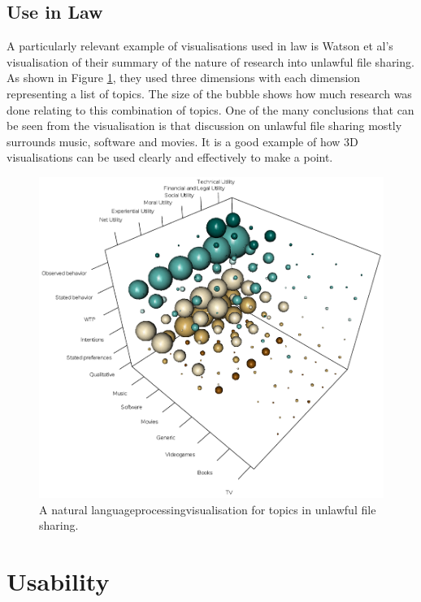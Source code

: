 			\subsection{Use in Law}
				A particularly relevant example of visualisations used in law is Watson et al's visualisation of their summary of the nature of research into unlawful file sharing\cite{file_sharing_scoping_watson}. As shown in Figure \ref{fig:law_cube}, they used three dimensions with each dimension representing a list of topics. The size of the bubble shows how much research was done relating to this combination of topics. One of the many conclusions that can be seen from the visualisation is that discussion on unlawful file sharing mostly surrounds music, software and movies. It is a good example of how 3D visualisations can be used clearly and effectively to make a point.
				\begin{figure}
    				\centering
    				\includegraphics[width=0.6\linewidth]{resources/images/law_vis_cube.png}
    				\caption{A natural languageprocessingvisualisation for topics in unlawful file sharing\cite{file_sharing_scoping_watson}.}
    				\label{fig:law_cube}
				\end{figure} 
	\section{Usability}
